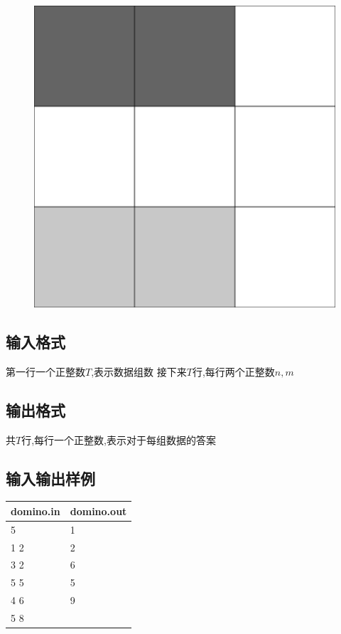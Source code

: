 \documentclass[12pt]{ctexart}
\begin{document}
\begin{figure}[htbp]
\begin{minipage}[t]{0.3\textwidth}
			\caption{}
		\end{minipage}
		\begin{minipage}[t]{0.3\textwidth}
			\centering
			\includegraphics{pictures/1-3.png}
			\caption{}
		\end{minipage}
	\end{figure}

	\subsection{输入格式}
	第一行一个正整数$T$,表示数据组数
	接下来$T$行,每行两个正整数$n,m$
	\subsection{输出格式}
	共$T$行,每行一个正整数,表示对于每组数据的答案
	\subsection{输入输出样例}
	\begin{center}
		\begin{tabular}{|p{6cm}|p{6cm}|}
			\hline domino.in&domino.out\\
			\hline	5&1\\
					1 2&2\\
					3 2&6\\
					5 5&5\\
					4 6&9\\
					5 8&\\
			\hline
		\end{tabular}
	\end{center}
\end{document}
